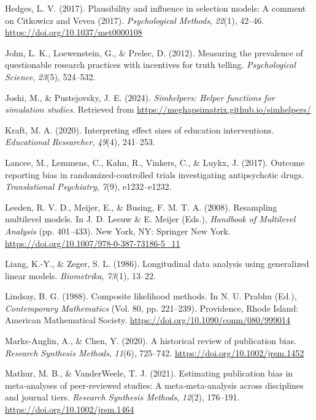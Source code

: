 \documentclass[
  american,
  man, donotrepeattitle,floatsintext]{apa7}
\newlength{\cslhangindent}
\newenvironment{CSLReferences}[2] %
 {\begin{list}{}{%
  \setlength{\itemindent}{0pt}
  \setlength{\leftmargin}{0pt}
  \setlength{\parsep}{0pt}
  \ifodd #1
   \setlength{\leftmargin}{\cslhangindent}
   \setlength{\itemindent}{-1\cslhangindent}
  \fi
  \setlength{\itemsep}{#2\baselineskip}}}
 {\end{list}}
\begin{document}
\begin{CSLReferences}{1}{0}
Hedges, L. V. (2017). Plausibility and influence in selection models: {A} comment on {Citkowicz} and {Vevea} (2017). \emph{Psychological Methods}, \emph{22}(1), 42--46. \url{https://doi.org/10.1037/met0000108}

John, L. K., Loewenstein, G., \& Prelec, D. (2012). Measuring the prevalence of questionable research practices with incentives for truth telling. \emph{Psychological Science}, \emph{23}(5), 524--532.

Joshi, M., \& Pustejovsky, J. E. (2024). \emph{Simhelpers: Helper functions for simulation studies}. Retrieved from \url{https://meghapsimatrix.github.io/simhelpers/}

Kraft, M. A. (2020). Interpreting effect sizes of education interventions. \emph{Educational Researcher}, \emph{49}(4), 241--253.

Lancee, M., Lemmens, C., Kahn, R., Vinkers, C., \& Luykx, J. (2017). Outcome reporting bias in randomized-controlled trials investigating antipsychotic drugs. \emph{Translational Psychiatry}, \emph{7}(9), e1232--e1232.

Leeden, R. V. D., Meijer, E., \& Busing, F. M. T. A. (2008). Resampling multilevel models. In J. D. Leeuw \& E. Meijer (Eds.), \emph{Handbook of {Multilevel} {Analysis}} (pp. 401--433). New York, NY: Springer New York. \url{https://doi.org/10.1007/978-0-387-73186-5_11}

Liang, K.-Y., \& Zeger, S. L. (1986). Longitudinal data analysis using generalized linear models. \emph{Biometrika}, \emph{73}(1), 13--22.

Lindsay, B. G. (1988). Composite likelihood methods. In N. U. Prabhu (Ed.), \emph{Contemporary {Mathematics}} (Vol. 80, pp. 221--239). Providence, Rhode Island: American Mathematical Society. \url{https://doi.org/10.1090/conm/080/999014}

Marks‐Anglin, A., \& Chen, Y. (2020). A historical review of publication bias. \emph{Research Synthesis Methods}, \emph{11}(6), 725--742. \url{https://doi.org/10.1002/jrsm.1452}

Mathur, M. B., \& VanderWeele, T. J. (2021). Estimating publication bias in meta‐analyses of peer‐reviewed studies: {A} meta‐meta‐analysis across disciplines and journal tiers. \emph{Research Synthesis Methods}, \emph{12}(2), 176--191. \url{https://doi.org/10.1002/jrsm.1464}


\end{CSLReferences}
\end{document}
